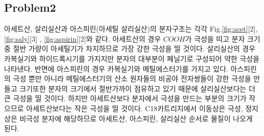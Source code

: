 \documentclass[%
 reprint,
 amsmath,amssymb,
 aps,
]{revtex4-2}
\begin{document}
\subsection{\label{sec:level2}Problem2}
아세트산, 살리실산과 아스피린(아세틸 살리실산)의 분자구조는 각각 Fig.\ref{fig:acet}[2], \ref{fig:saly}[3] , \ref{fig:aspirin}[2]와 같다. 아세트산의 경우 $COOH$가 극성을 띠고 분자 크기중 절반 가량이 아세틸기가 차지하므로 가장 강한 극성을 띨 것이다. 살리실산의 경우 카복실기와 하이드록시기를 가지지만 분자의 대부분이 페닐기로 구성되어 약한 극성을 나타낸다. 반면에 아스피린의 경우 카복실기와 메틸에스터기를 가지고 있다. 아스피린의 극성 뿐만 아니라 메틸에스터기의 산소 원자들의 비공야 전자쌍들이 강한 극성을 만들고 크기또한 분자의 크기에서 절반가까이 점유하고 있기 때문에 살리실산보다는 더 큰 극성을 띨 것이다. 하지만 아세트산보다 분자에서 극성을 만드는 부분의 크기가 작으므로 아세트산보다는 작은 극성을 띨 것이다. C18카트리지에서 이동상은 극성, 정지상은 비극성 분자에 해당하므로 아세트산, 아스피린, 살리실산 순서로 물질이 나오게 된다.
\end{document}
